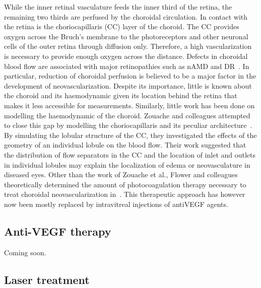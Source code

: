 \documentclass[12pt,a4paper]{journal}
\begin{document}
While the inner retinal vasculature feeds the inner third of the retina, the remaining two thirds are perfused by the choroidal circulation.
In contact with the retina is the choriocapillaris (CC) layer of the choroid.
The CC provides oxygen across the Bruch's membrane to the photoreceptors and other neuronal cells of the outer retina through diffusion only.
Therefore, a high vascularization is necessary to provide enough oxygen across the distance.
Defects in choroidal blood flow are associated with major retinopathies such as nAMD and DR~\cite{Pemp_2008}.
In particular, reduction of choroidal perfusion is believed to be a major factor in the development of neovascularization.
Despite its importance, little is known about the choroid and its haemodynamic given its location behind the retina that makes it less accessible for measurements. 
Similarly, little work has been done on modelling the haemodynamic of the choroid.
Zouache and colleagues attempted to close this gap by modelling the choriocapillaris and its peculiar architecture~\cite{Zouache_2015}.
By simulating the lobular structure of the CC, they investigated the effects of the geometry of an individual lobule on the blood flow.
Their work suggested that the distribution of flow separators in the CC and the location of inlet and outlets in individual lobules may explain the localization of edema or neovasculature in diseased eyes.
Other than the work of Zouache et al., Flower and colleagues theoretically determined the amount of photocoagulation therapy necessary to treat choroidal neovascularization in~\cite{Flower_2001}.
This therapeutic approach has however now been mostly replaced by intravitreal injections of antiVEGF agents.


\subsection{Anti-VEGF therapy}
Coming soon.
\subsection{Laser treatment}

{\normalsize }
\end{document}
